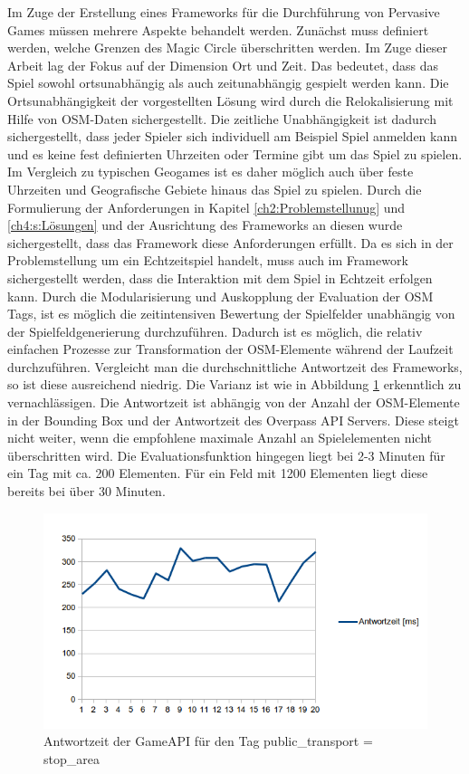Im Zuge der Erstellung eines Frameworks für die Durchführung von Pervasive Games müssen mehrere Aspekte behandelt werden. Zunächst muss definiert werden, welche Grenzen des Magic Circle überschritten werden. Im Zuge dieser Arbeit lag der Fokus auf der Dimension Ort und Zeit. Das bedeutet, dass das Spiel sowohl ortsunabhängig als auch zeitunabhängig gespielt werden kann. Die Ortsunabhängigkeit der vorgestellten Lösung wird durch die Relokalisierung mit Hilfe von OSM-Daten sichergestellt. Die zeitliche Unabhängigkeit ist dadurch sichergestellt, dass jeder Spieler sich individuell am Beispiel Spiel anmelden kann und es keine fest definierten Uhrzeiten oder Termine gibt um das Spiel zu spielen. Im Vergleich zu typischen Geogames ist es daher möglich auch über feste Uhrzeiten und Geografische Gebiete hinaus das Spiel zu spielen. Durch die Formulierung der Anforderungen in Kapitel \ref{ch2:Problemstellunug} und \ref{ch4:s:Lösungen} und der Ausrichtung des Frameworks an diesen wurde sichergestellt, dass das Framework diese Anforderungen erfüllt. Da es sich in der Problemstellung um ein Echtzeitspiel handelt, muss auch im Framework sichergestellt werden, dass die Interaktion mit dem Spiel in Echtzeit erfolgen kann.
Durch die Modularisierung und Auskopplung der Evaluation der OSM Tags, ist es möglich die zeitintensiven Bewertung der Spielfelder unabhängig von der Spielfeldgenerierung durchzuführen. Dadurch ist es möglich, die relativ einfachen Prozesse zur Transformation der OSM-Elemente während der Laufzeit durchzuführen. Vergleicht man die durchschnittliche Antwortzeit des Frameworks, so ist diese ausreichend niedrig. Die Varianz ist wie in Abbildung \ref{img:ch6_img01_response_time} erkenntlich zu vernachlässigen.  Die Antwortzeit ist  abhängig von der Anzahl der OSM-Elemente in der Bounding Box und der Antwortzeit des Overpass API Servers. Diese steigt nicht weiter, wenn die empfohlene maximale Anzahl an Spielelementen nicht überschritten wird. Die Evaluationsfunktion hingegen liegt bei 2-3 Minuten für ein Tag mit ca. 200 Elementen. Für ein Feld mit 1200 Elementen liegt diese bereits bei über 30 Minuten.

\begin{figure}[H]
\begin{center}
\includegraphics[width=150mm]{images/ch6_img01_response_time.png}
\caption{Antwortzeit der GameAPI für den Tag public\_transport = stop\_area}
\label{img:ch6_img01_response_time}
\end{center}
\end{figure}

